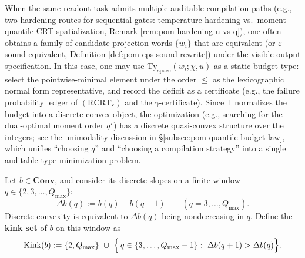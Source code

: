 \begin{remark}\label{rem:pom-type-directed-normalization}
When the same readout task admits multiple auditable compilation paths (e.g., two hardening routes for sequential gates: temperature hardening vs.\ moment-quantile-CRT spatialization, Remark \ref{rem:pom-hardening-u-vs-q}), one often obtains a family of candidate projection words \(\{w_i\}\) that are equivalent (or \(\varepsilon\)-sound equivalent, Definition \ref{def:pom-eps-sound-rewrite}) under the visible output specification.
In this case, one may use \(\mathrm{Ty}_{\mathrm{space}}(w_i;\chi,u)\) as a static budget type: select the pointwise-minimal element under the order \( \le \) as the lexicographic normal form representative, and record the deficit as a certificate (e.g., the failure probability ledger of \((\mathrm{RCRT}_\varepsilon)\) and the \(\gamma\)-certificate).
Since \(\mathbb{T}\) normalizes the budget into a discrete convex object, the optimization (e.g., searching for the dual-optimal moment order \(q^\star\)) has a discrete quasi-convex structure over the integers; see the unimodality discussion in \S\ref{subsec:pom-quantile-budget-law}, which unifies ``choosing \(q\)'' and ``choosing a compilation strategy'' into a single auditable type minimization problem.
\end{remark}

\begin{definition}\label{def:pom-kink-set}
Let \(b\in\mathbf{Conv}\), and consider its discrete slopes on a finite window \(q\in\{2,3,\dots,Q_{\max}\}\):
\[
\Delta b(q):=b(q)-b(q-1)\qquad(q=3,\dots,Q_{\max}).
\]
Discrete convexity is equivalent to \(\Delta b(q)\) being nondecreasing in \(q\).
Define the \textbf{kink set} of \(b\) on this window as
\[
\mathrm{Kink}(b)
:=\{2,Q_{\max}\}\ \cup\
\Bigl\{\,q\in\{3,\dots,Q_{\max}-1\}:\ \Delta b(q+1)>\Delta b(q)\Bigr\}.
\]
\end{definition}

